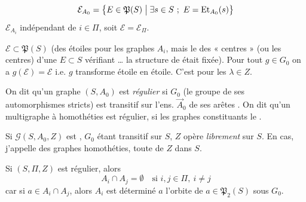 \documentclass[11pt,a4paper]{article}
\begin{document}
\[
\mathcal{E}_{A_0} = \bigl\{E\in\mathfrak{P}(S) \bigm| \exists s\in S\ ;\ E=\mathrm{Et}_{A_0}(s)\bigr\}
\]
$\mathcal{E}_{A_i}$ indépendant de $i\in\Pi$, soit $\mathcal{E}=\mathcal{E}_\Pi$.

  $\mathcal{E}\subset\mathfrak{P}(S)$ (des étoiles pour les graphes $A_i$, mais le   des « centres » \struck{\ill{}} (ou les centres) d'une  $E\subset S$ vérifiant … \ill{} la structure de \ill{} était fixée). Pour tout $g\in G_0$ on a $g(\mathcal{E})=\mathcal{E}$ i.e. $g$ transforme étoile en étoile. C'est   pour les $\lambda\in Z$.


On dit qu'un graphe $(S,A_0)$ est \emph{régulier} si $G_0$ (le groupe de ses automorphismes stricts) est transitif sur l'ens. $\vec{A}_0$ de ses arêtes  . On dit qu'un multigraphe \struck{\ill{}} à homothéties est régulier, si les graphes constituants le  .

Si $\mathcal{G}(S,A_0,Z)$ est , $G_0$ étant transitif sur $S$, $Z$ opère \emph{librement} sur $S$. En  cas, j'appelle \emph{} des graphes  homothéties, toute \ill{} de $Z$ dans $S$.

\struck{\ill{}} Si $(S,\Pi,Z)$  est régulier, alors 
\[
A_i\cap A_j=\emptyset \quad\text{si } i,j\in\Pi,\ i\neq j \tag{14}
\]
car si $a\in A_i\cap A_j$, alors $A_i$ est déterminé  $a$ \ill{} l'orbite de $a\in\mathfrak{P}_2(S)$ sous $G_0$.
\end{document}
